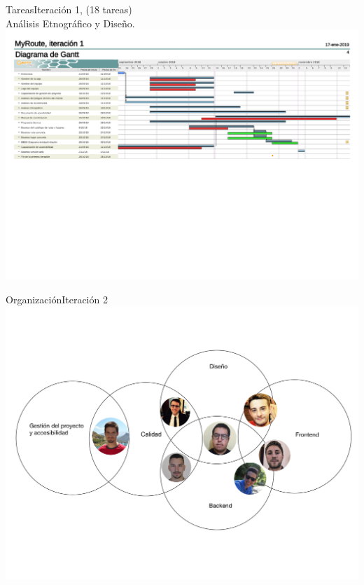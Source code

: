 \documentclass{beamer}
\begin{document}
\begin{frame}{Tareas}{Iteraci\'on 1, (18 tareas)\\
 An\'alisis Etnogr\'afico y Dise\~no.}
\centering
\hspace{1cm}
\\[1cm]
\includegraphics[width=0.8\paperwidth]{images_latex/gantt_itr1}

\end{frame}



\begin{frame}{Organizaci\'on}{Iteraci\'on 2}
\includegraphics[scale=0.1]{images_latex/org_itr2}
\end{frame}
\end{document}
